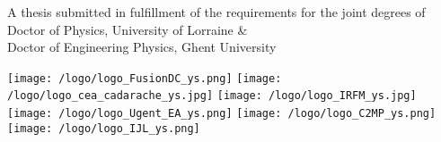 \begin{titlepage}
\begin{center}
\begin{tabular}{lcl}
\hline
\end{tabular}

\vspace{1cm}


A thesis submitted in fulfillment of the requirements for the joint degrees of\\
Doctor of Physics, University of Lorraine \& \\
Doctor of Engineering Physics, Ghent University\\

\vspace{.7cm}



\texttt{[image: /logo/logo\_FusionDC\_ys.png]} \hspace{+0.1cm}
\texttt{[image: /logo/logo\_cea\_cadarache\_ys.jpg]} \hspace{+0.1cm}
\texttt{[image: /logo/logo\_IRFM\_ys.jpg]} \hspace{+0.1cm}
\texttt{[image: /logo/logo\_Ugent\_EA\_ys.png]} \hspace{+0.1cm}
\texttt{[image: /logo/logo\_C2MP\_ys.png]} \hspace{+0.1cm}
\texttt{[image: /logo/logo\_IJL\_ys.png]} \\


\end{center}


\end{titlepage}





